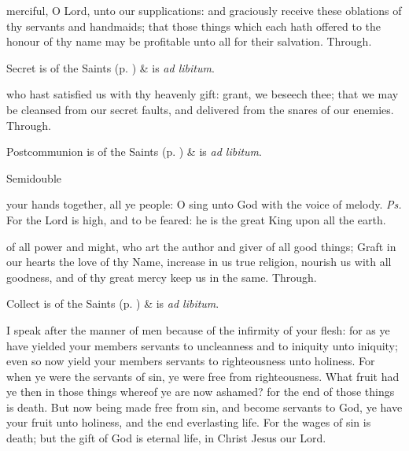 
\secret
{} merciful, O Lord, unto our supplications: and graciously receive these oblations of thy servants and handmaids; that those things which each hath offered to the honour of thy name may be profitable unto all for their salvation. Through.
\begin{rubric}
     Secret is of the Saints (p. \pageref{SPSaints}) \&  is \emph{ad libitum}.
\end{rubric}


\postcommunion
{} who hast satisfied us with thy heavenly gift: grant, we beseech thee; that we may be cleansed from our secret faults, and delivered from the snares of our enemies. Through.
\begin{rubric}
     Postcommunion is of the Saints (p. \pageref{SPSaints}) \&  is \emph{ad libitum}.
\end{rubric}


\begin{inhead}
    {Semidouble}
\end{inhead}

\properantiphonfix

\introit
{} your hands together, all ye people: O sing unto God with the voice of melody. \textit{Ps.} For the Lord is high, and to be feared: he is the great King upon all the earth.

\collect
{} of all power and might, who art the author and giver of all good things; Graft in our hearts the love of thy Name, increase in us true religion, nourish us with all goodness, and of thy great mercy keep us in the same. Through.

\begin{rubric}
     Collect is of the Saints (p. \pageref{SPSaints}) \&  is \emph{ad libitum}.
\end{rubric}

 I speak after the manner of men because of the infirmity of your flesh: for as ye have yielded your members servants to uncleanness and to iniquity unto iniquity; even so now yield your members servants to righteousness unto holiness. For when ye were the servants of sin, ye were free from righteousness. What fruit had ye then in those things whereof ye are now ashamed? for the end of those things is death. But now being made free from sin, and become servants to God, ye have your fruit unto holiness, and the end everlasting life. For the wages of sin is death; but the gift of God is eternal life, in Christ Jesus our Lord.

